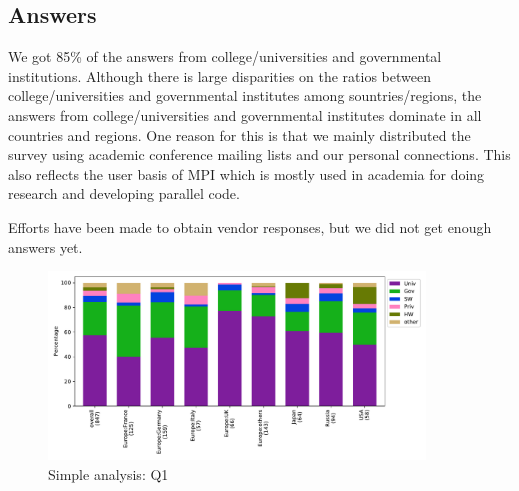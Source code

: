 
\subsection{Answers}


We got 85\% of the answers from college/universities and governmental
institutions. 
Although there is large disparities on the ratios between
college/universities and governmental institutes among
sountries/regions, the answers from college/universities and
governmental institutes dominate in all countries and regions. 
One reason for this is that we mainly distributed the
survey using 
academic conference mailing lists and our personal connections. This also
reflects the user basis of MPI which is mostly used in academia for doing
research and developing parallel code. 

Efforts have been made to obtain vendor
responses, but we did not get enough answers yet.

\begin{figure}[htb]
\begin{center}
\includegraphics[width=10cm]{../pdfs/Q1.pdf}
\caption{Simple analysis: Q1}
\label{fig:Q1}
\end{center}
\end{figure}

